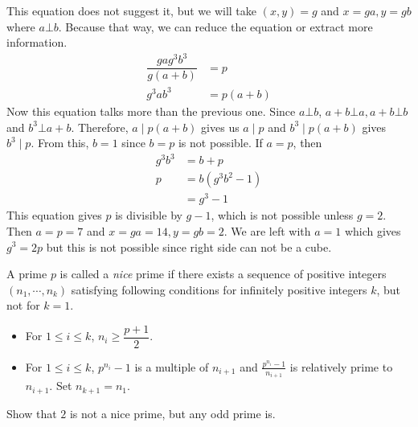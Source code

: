 \begin{solution}
	This equation does not suggest it, but we will take $(x,y)=g$ and $x=ga,y=gb$ where $a\bot b$. Because that way, we can reduce the equation or extract more information.
		\begin{align*}
			\dfrac{gag^3b^3}{g(a+b)} & = p\\
			g^3ab^3 & = p(a+b)
		\end{align*}
	Now this equation talks more than the previous one. Since $a\bot b$, $a+b\bot a,a+b\bot b$ and $b^3\bot a+b$. Therefore, $a\mid p(a+b)$ gives us $a\mid p$ and $b^3\mid p(a+b)$ gives $b^3\mid p$. From this, $b=1$ since $b=p$ is not possible. If $a=p$, then
		\begin{align*}
			g^3b^3 & = b+p\\
			p & = b(g^3b^2-1)\\
	  & = g^3-1
		\end{align*}
	This equation gives $p$ is divisible by $g-1$, which is not possible unless $g=2$. Then $a=p=7$ and $x=ga=14,y=gb=2$. We are left with $a=1$ which gives $g^3=2p$ but this is not possible since right side can not be a cube.
\end{solution}

\begin{problem}[Korea $2010$]
	A prime $p$ is called a \textit{nice} prime if there exists a sequence of positive integers $(n_1,\cdots,n_k)$ satisfying following conditions for infinitely positive integers $k$, but not for $k=1$.
		\begin{itemize}
			\item For $1\leq i\leq k$, $n_i\geq\dfrac{p+1}{2}$.
			\item For $1\leq i\leq k$, $p^{n_i}-1$ is a multiple of $n_{i+1}$ and $\frac{p^{n_i}-1}{n_{i+1}}$ is relatively prime to $n_{i+1}$. Set $n_{k+1} = n_1$.
		\end{itemize}
	Show that $2$ is not a nice prime, but any odd prime is.
\end{problem}

